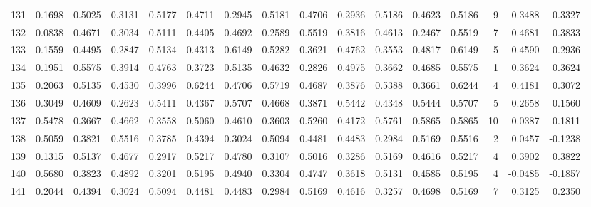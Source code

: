 \begin{tabular}{lrrrrrrrrrrrrrrr}
131 &      0.1698 &  0.5025 &  0.3131 &  0.5177 &  0.4711 &  0.2945 &  0.5181 &  0.4706 &  0.2936 &  0.5186 &   0.4623 &     0.5186 &      9 &                    0.3488 &                     0.3327 \\
132 &      0.0838 &  0.4671 &  0.3034 &  0.5111 &  0.4405 &  0.4692 &  0.2589 &  0.5519 &  0.3816 &  0.4613 &   0.2467 &     0.5519 &      7 &                    0.4681 &                     0.3833 \\
133 &      0.1559 &  0.4495 &  0.2847 &  0.5134 &  0.4313 &  0.6149 &  0.5282 &  0.3621 &  0.4762 &  0.3553 &   0.4817 &     0.6149 &      5 &                    0.4590 &                     0.2936 \\
134 &      0.1951 &  0.5575 &  0.3914 &  0.4763 &  0.3723 &  0.5135 &  0.4632 &  0.2826 &  0.4975 &  0.3662 &   0.4685 &     0.5575 &      1 &                    0.3624 &                     0.3624 \\
135 &      0.2063 &  0.5135 &  0.4530 &  0.3996 &  0.6244 &  0.4706 &  0.5719 &  0.4687 &  0.3876 &  0.5388 &   0.3661 &     0.6244 &      4 &                    0.4181 &                     0.3072 \\
136 &      0.3049 &  0.4609 &  0.2623 &  0.5411 &  0.4367 &  0.5707 &  0.4668 &  0.3871 &  0.5442 &  0.4348 &   0.5444 &     0.5707 &      5 &                    0.2658 &                     0.1560 \\
137 &      0.5478 &  0.3667 &  0.4662 &  0.3558 &  0.5060 &  0.4610 &  0.3603 &  0.5260 &  0.4172 &  0.5761 &   0.5865 &     0.5865 &     10 &                    0.0387 &                    -0.1811 \\
138 &      0.5059 &  0.3821 &  0.5516 &  0.3785 &  0.4394 &  0.3024 &  0.5094 &  0.4481 &  0.4483 &  0.2984 &   0.5169 &     0.5516 &      2 &                    0.0457 &                    -0.1238 \\
139 &      0.1315 &  0.5137 &  0.4677 &  0.2917 &  0.5217 &  0.4780 &  0.3107 &  0.5016 &  0.3286 &  0.5169 &   0.4616 &     0.5217 &      4 &                    0.3902 &                     0.3822 \\
140 &      0.5680 &  0.3823 &  0.4892 &  0.3201 &  0.5195 &  0.4940 &  0.3304 &  0.4747 &  0.3618 &  0.5131 &   0.4585 &     0.5195 &      4 &                   -0.0485 &                    -0.1857 \\
141 &      0.2044 &  0.4394 &  0.3024 &  0.5094 &  0.4481 &  0.4483 &  0.2984 &  0.5169 &  0.4616 &  0.3257 &   0.4698 &     0.5169 &      7 &                    0.3125 &                     0.2350 \\

\end{tabular}
